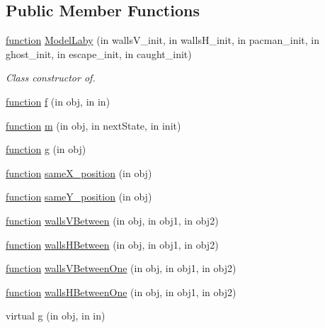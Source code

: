 \subsection*{Public Member Functions}
\begin{DoxyCompactItemize}
\item 
\hyperlink{_plan__desuma_functions__2_players_8m_ac2ffb26d6f42d3bbcd7847b0873403f4}{function} \hyperlink{class_model_laby_a014d91cfa3ecf1a6fc3ca75ea4f433d4}{Model\+Laby} (in walls\+V\+\_\+init, in walls\+H\+\_\+init, in pacman\+\_\+init, in ghost\+\_\+init, in escape\+\_\+init, in caught\+\_\+init)
\begin{DoxyCompactList}\small\item\em Class constructor of. \end{DoxyCompactList}\item 
\hyperlink{_plan__desuma_functions__2_players_8m_ac2ffb26d6f42d3bbcd7847b0873403f4}{function} \hyperlink{class_model_laby_a6f3b146c92a207e95690d08975e1e072}{f} (in obj, in in)
\item 
\hyperlink{_plan__desuma_functions__2_players_8m_ac2ffb26d6f42d3bbcd7847b0873403f4}{function} \hyperlink{class_model_laby_a3140f24c6c4b80037b7d4f521c6ae2d3}{m} (in obj, in next\+State, in init)
\item 
\hyperlink{_plan__desuma_functions__2_players_8m_ac2ffb26d6f42d3bbcd7847b0873403f4}{function} \hyperlink{class_model_laby_a07dadfabe92bf9a144b8a862720e7746}{g} (in obj)
\item 
\hyperlink{_plan__desuma_functions__2_players_8m_ac2ffb26d6f42d3bbcd7847b0873403f4}{function} \hyperlink{class_model_laby_ac2632946f3f89dcc57c9f1fd31bbfb53}{same\+X\+\_\+position} (in obj)
\item 
\hyperlink{_plan__desuma_functions__2_players_8m_ac2ffb26d6f42d3bbcd7847b0873403f4}{function} \hyperlink{class_model_laby_a104c64766fa031eb4a29214f07da63d2}{same\+Y\+\_\+position} (in obj)
\item 
\hyperlink{_plan__desuma_functions__2_players_8m_ac2ffb26d6f42d3bbcd7847b0873403f4}{function} \hyperlink{class_model_laby_adf2ec45a05676923165cb7f273900569}{walls\+V\+Between} (in obj, in obj1, in obj2)
\item 
\hyperlink{_plan__desuma_functions__2_players_8m_ac2ffb26d6f42d3bbcd7847b0873403f4}{function} \hyperlink{class_model_laby_a488955f2ead0854b15302161753a0a66}{walls\+H\+Between} (in obj, in obj1, in obj2)
\item 
\hyperlink{_plan__desuma_functions__2_players_8m_ac2ffb26d6f42d3bbcd7847b0873403f4}{function} \hyperlink{class_model_laby_ab8486279acbf0a66424a84fa210d1b71}{walls\+V\+Between\+One} (in obj, in obj1, in obj2)
\item 
\hyperlink{_plan__desuma_functions__2_players_8m_ac2ffb26d6f42d3bbcd7847b0873403f4}{function} \hyperlink{class_model_laby_a450d4d89542d177b6676375984146f4c}{walls\+H\+Between\+One} (in obj, in obj1, in obj2)
\item 
virtual \hyperlink{class_model_s_e_d_a2d53b5f665cfcf64d482bbfa8a6eb098}{g} (in obj, in in)
\end{DoxyCompactItemize}

